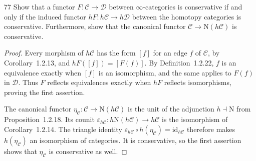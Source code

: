 \begin{exercise}{77}
Show that a functor $F\colon\mathcal C\to\mathcal D$ between $\infty$-categories is
conservative if and only if the induced functor $hF\colon h\mathcal C\to h\mathcal D$
between the homotopy categories is conservative. Furthermore, show that the canonical
functor $\mathcal C\to\mathrm N(h\mathcal C)$ is conservative.

\begin{proof}
Every morphism of $h\mathcal C$ has the form $[f]$ for an edge
$f$ of $\mathcal C$, by Corollary~1.2.13, and
$hF([f])=[F(f)]$.
By Definition~1.2.22, $f$ is an equivalence exactly when $[f]$
is an isomorphism, and the same applies to $F(f)$ in $\mathcal D$.
Thus $F$ reflects equivalences exactly when $hF$ reflects
isomorphisms, proving the first assertion.

The canonical functor $\eta_{\mathcal C}\colon\mathcal C\to
\mathrm N(h\mathcal C)$ is the unit of the adjunction
$h\dashv\mathrm N$ from Proposition~1.2.18.
Its counit $\varepsilon_{h\mathcal C}\colon
h\mathrm N(h\mathcal C)\to h\mathcal C$ is the isomorphism
of Corollary~1.2.14.
The triangle identity
$\varepsilon_{h\mathcal C}\circ h(\eta_{\mathcal C})
=\mathrm{id}_{h\mathcal C}$ therefore makes
$h(\eta_{\mathcal C})$ an isomorphism of categories.
It is conservative, so the first assertion shows that
$\eta_{\mathcal C}$ is conservative as well.
\end{proof}
\end{exercise}
